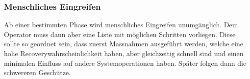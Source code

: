 \subsubsection*{Menschliches Eingreifen}

Ab einer bestimmten Phase wird menschliches Eingreifen unumgänglich. Dem Operator muss dann aber eine Liste mit möglichen Schritten vorliegen. Diese sollte so geordnet sein, dass zuerst Massnahmen ausgeführt werden, welche eine hohe Recoverywahrscheinlichkeit haben, aber gleichzeitig schnell sind und einen minimalen Einfluss auf andere Systemoperationen haben. Später folgen dann die schwereren Geschütze.

